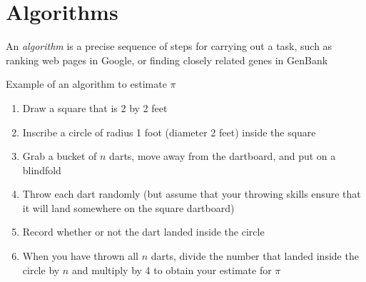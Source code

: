 \documentclass[8pt,a4paper,compress]{beamer}
\begin{document}
\section{Algorithms}
\begin{frame}[fragile]
An \emph{algorithm} is a precise sequence of steps for carrying out a task, such as ranking web pages in Google, or finding closely related genes in GenBank

\bigskip

Example of an algorithm to estimate $\pi$

\begin{enumerate}
\item Draw a square that is 2 by 2 feet
\item Inscribe a circle of radius 1 foot (diameter 2 feet) inside the square
\item Grab a bucket of $n$ darts, move away from the dartboard, and put on a blindfold
\item Throw each dart randomly (but assume that your throwing skills ensure that it will land somewhere on the square dartboard)
\item Record whether or not the dart landed inside the circle
\item When you have thrown all $n$ darts, divide the number that landed inside the circle by $n$ and multiply by 4 to obtain your estimate for $\pi$
\end{enumerate}
\end{frame}
\end{document}
